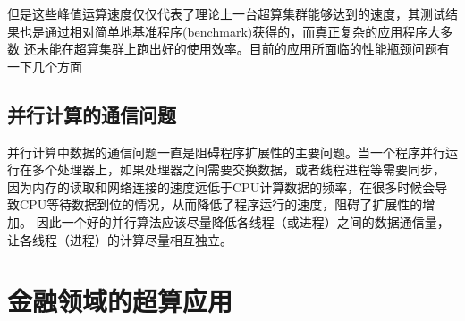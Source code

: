 但是这些峰值运算速度仅仅代表了理论上一台超算集群能够达到的速度，其测试结果也是通过相对简单地基准程序(benchmark)获得的，而真正复杂的应用程序大多数
还未能在超算集群上跑出好的使用效率。目前的应用所面临的性能瓶颈问题有一下几个方面

\subsection{并行计算的通信问题} %
\label{sub:intro-com}
并行计算中数据的通信问题一直是阻碍程序扩展性的主要问题。当一个程序并行运行在多个处理器上，如果处理器之间需要交换数据，或者线程进程等需要同步，
因为内存的读取和网络连接的速度远低于CPU计算数据的频率，在很多时候会导致CPU等待数据到位的情况，从而降低了程序运行的速度，阻碍了扩展性的增加。
因此一个好的并行算法应该尽量降低各线程（或进程）之间的数据通信量，让各线程（进程）的计算尽量相互独立。





\section{金融领域的超算应用} %
\label{sec:intro-finance}



